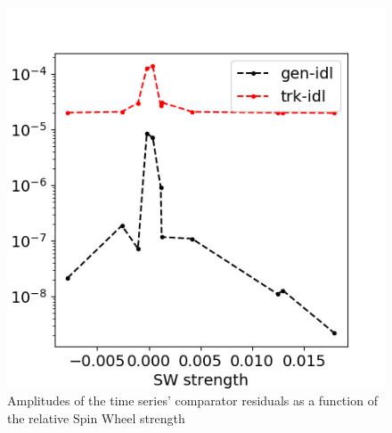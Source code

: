 \documentclass[a4paper]{jacow}
\begin{document}
\begin{figure}[h]
  \centering
    \includegraphics[width=\linewidth]{../img/IPAC19/residual_amplitude_vs_SW(both)}
  \caption{Amplitudes of the time series' comparator residuals as a function of
    the relative Spin Wheel strength\label{fig:residuals}}
\end{figure}
\end{document}
